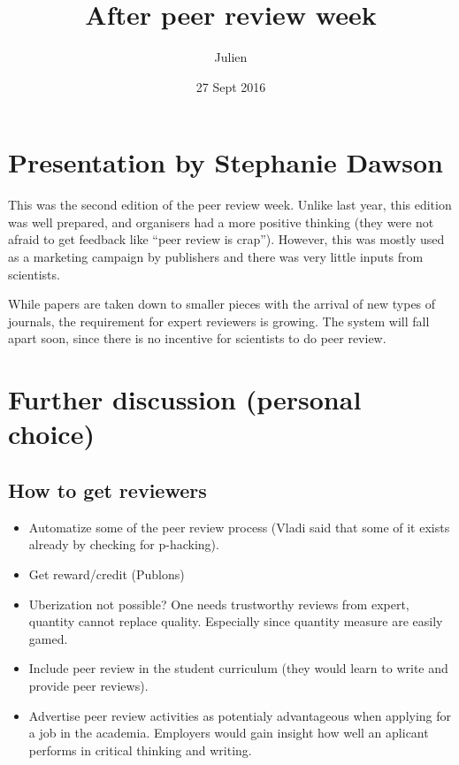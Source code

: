 \documentclass[]{article}
\title{After peer review week}
\author{Julien}
\date{27 Sept 2016}
\begin{document}
\maketitle


{
\hypersetup{linkcolor=black}
\setcounter{tocdepth}{2}
\tableofcontents
}
\section{Presentation by Stephanie
Dawson}\label{presentation-by-stephanie-dawson}

This was the second edition of the peer review week. Unlike last year,
this edition was well prepared, and organisers had a more positive
thinking (they were not afraid to get feedback like ``peer review is
crap''). However, this was mostly used as a marketing campaign by
publishers and there was very little inputs from scientists.

While papers are taken down to smaller pieces with the arrival of new
types of journals, the requirement for expert reviewers is growing. The
system will fall apart soon, since there is no incentive for scientists
to do peer review.

\section{Further discussion (personal
choice)}\label{further-discussion-personal-choice}

\subsection{How to get reviewers}\label{how-to-get-reviewers}

\begin{itemize}
\item
  Automatize some of the peer review process (Vladi said that some of it
  exists already by checking for p-hacking).
\item
  Get reward/credit (Publons)
\item
  Uberization not possible? One needs trustworthy reviews from expert,
  quantity cannot replace quality. Especially since quantity measure are
  easily gamed.
\item
  Include peer review in the student curriculum (they would learn to
  write and provide peer reviews).
\item
  Advertise peer review activities as potentialy advantageous when
  applying for a job in the academia. Employers would gain insight how
  well an aplicant performs in critical thinking and writing.
\end{itemize}
\end{document}
